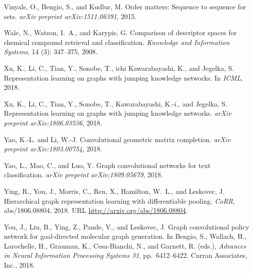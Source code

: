 \documentclass{article}
\begin{document}
\begin{thebibliography}{57}
Vinyals, O., Bengio, S., and Kudlur, M.
\newblock Order matters: Sequence to sequence for sets.
\newblock \emph{arXiv preprint arXiv:1511.06391}, 2015.

Wale, N., Watson, I.~A., and Karypis, G.
\newblock Comparison of descriptor spaces for chemical compound retrieval and
  classification.
\newblock \emph{Knowledge and Information Systems}, 14 (3):
  347--375, 2008.

Xu, K., Li, C., Tian, Y., Sonobe, T., ichi Kawarabayashi, K., and Jegelka, S.
\newblock Representation learning on graphs with jumping knowledge networks.
\newblock In \emph{ICML}, 2018{}.

Xu, K., Li, C., Tian, Y., Sonobe, T., Kawarabayashi, K.-i., and Jegelka, S.
\newblock Representation learning on graphs with jumping knowledge networks.
\newblock \emph{arXiv preprint arXiv:1806.03536}, 2018{}.

Yao, K.-L. and Li, W.-J.
\newblock Convolutional geometric matrix completion.
\newblock \emph{arXiv preprint arXiv:1803.00754}, 2018.

Yao, L., Mao, C., and Luo, Y.
\newblock Graph convolutional networks for text classification.
\newblock \emph{arXiv preprint arXiv:1809.05679}, 2018.

Ying, R., You, J., Morris, C., Ren, X., Hamilton, W.~L., and Leskovec, J.
\newblock Hierarchical graph representation learning with differentiable
  pooling.
\newblock \emph{CoRR}, abs/1806.08804, 2018.
\newblock URL \url{http://arxiv.org/abs/1806.08804}.

You, J., Liu, B., Ying, Z., Pande, V., and Leskovec, J.
\newblock Graph convolutional policy network for goal-directed molecular graph
  generation.
\newblock In Bengio, S., Wallach, H., Larochelle, H., Grauman, K.,
  Cesa-Bianchi, N., and Garnett, R. (eds.), \emph{Advances in Neural
  Information Processing Systems 31}, pp.\  6412--6422. Curran Associates,
  Inc., 2018.


\end{thebibliography}
\end{document}
